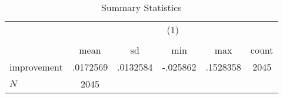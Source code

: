 \begin{table}[htbp]\centering
\def\sym#1{\ifmmode^{#1}\else\(^{#1}\)\fi}
\caption{Summary Statistics}
\begin{tabular}{l*{1}{ccccc}}
\hline\hline
            &\multicolumn{5}{c}{(1)}                                         \\
            &\multicolumn{5}{c}{}                                            \\
            &        mean&          sd&         min&         max&       count\\
\hline
improvement &    .0172569&    .0132584&    -.025862&    .1528358&        2045\\
\hline
\(N\)       &        2045&            &            &            &            \\
\hline\hline
\end{tabular}
\end{table}
